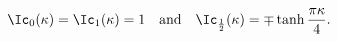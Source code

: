 \begin{equation}
\Ic_{0}(\kappa)=\Ic_{1}(\kappa)=1
\quad\text{and}\quad \Ic_{\frac12}(\kappa)=\mp\tanh\frac{\pi\kappa}{4}.
\end{equation}

